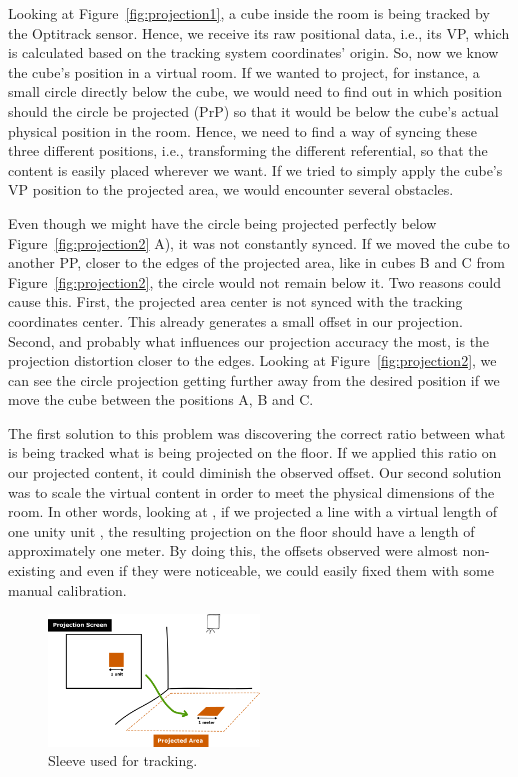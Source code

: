 Looking at Figure~\ref{fig:projection1}, a cube inside the room is being tracked by the Optitrack sensor. Hence, we receive its raw positional data, i.e., its \ac{VP}, which is calculated based on the tracking system coordinates' origin.
So, now we know the cube's position in a virtual room. If we wanted to project, for instance, a small circle directly below the cube, we would need to find out in which position should the circle be projected (\ac{PrP}) so that it would be below the cube's actual physical position in the room. Hence, we need to find a way of syncing these three different positions, i.e., transforming the different referential, so that the content is easily placed wherever we want. If we tried to simply apply the cube's \ac{VP} position to the projected area, we would encounter several obstacles.



Even though we might have the circle being projected perfectly below Figure~\ref{fig:projection2} A), it was not constantly synced.
If we moved the cube to another \ac{PP}, closer to the edges of the projected area, like in cubes B and C from Figure~\ref{fig:projection2}, the circle would not remain below it. 
Two reasons could cause this. First, the projected area center is not synced with the tracking coordinates center. 
This already generates a small offset in our projection. 
Second, and probably what influences our projection accuracy the most, is the projection distortion closer to the edges.
Looking at Figure~\ref{fig:projection2}, we can see the circle projection getting further away from the desired position if we move the cube between the positions A, B and C.

The first solution to this problem was discovering the correct ratio between what is being tracked what is being projected on the floor. 
If we applied this ratio on our projected content, it could diminish the observed offset. 
Our second solution was to scale the virtual content in order to meet the physical dimensions of the room. 
In other words, looking at , if we projected a line with a virtual length of one unity unit , the resulting projection on the floor should have a length of approximately one meter.
By doing this, the offsets observed were almost non-existing and even if they were noticeable, we could easily fixed them with some manual calibration.

\begin{figure}[!t]
    \begin{center}
        \includegraphics[width=0.5\textwidth]{imgs/impl/projection3}
    \end{center}
    \caption{Sleeve used for tracking.}
    \label{fig:projection3}
\end{figure}

